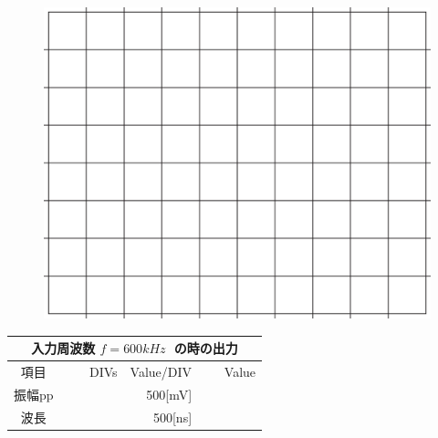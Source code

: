 \documentclass[uplatex,a4paper,11pt,oneside,openany]{jsbook}
\begin{document}
\begin{multicols}{2}
  \begin{figure}[H]
     \centering
      \includegraphics[keepaspectratio, scale=0.28, angle=0]
                  {figs/eps/grid.eps}
                  \label{fig:grid40mV}
  \end{figure}

  \begin{spacing}{1.5}
  \begin{tabular}{|c||r|r|r|}
    \multicolumn{4}{c}{入力周波数 $f=600kHz\;$ の時の出力} \\ \hline
    項目 & DIVs & Value/DIV & Value \\ \hline \hline
    振幅pp & 　　　　 & 500[mV]& 　　　　 \\ \hline
    波長 & 　　　　 & 500[ns]& 　　　　 \\ \hline
  \end{tabular}
\end{spacing}
\end{multicols}

\vfill
\end{document}
